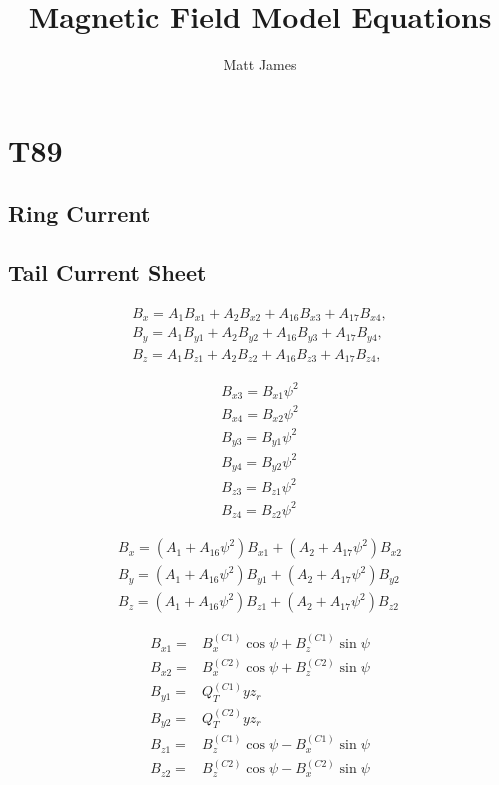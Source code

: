 \documentclass[]{article}
\title{Magnetic Field Model Equations}
\author{Matt James}
\begin{document}
\maketitle

	
\section{T89}

	\subsection{Ring Current}
	

	\subsection{Tail Current Sheet}
		\begin{align}
			B_x = A_1B_{x1} + A_2B_{x2} + A_{16}B_{x3} + A_{17}B_{x4},\\
			B_y = A_1B_{y1} + A_2B_{y2} + A_{16}B_{y3} + A_{17}B_{y4},\\
			B_z = A_1B_{z1} + A_2B_{z2} + A_{16}B_{z3} + A_{17}B_{z4},
		\end{align}
	
		\begin{align}
			B_{x3} = B_{x1}\psi^2 \\
			B_{x4} = B_{x2}\psi^2 \\
			B_{y3} = B_{y1}\psi^2 \\
			B_{y4} = B_{y2}\psi^2 \\
			B_{z3} = B_{z1}\psi^2 \\
			B_{z4} = B_{z2}\psi^2 
		\end{align}
	
		\begin{align}
			B_x = (A_1 + A_{16} \psi^2)B_{x1} + (A_2 + A_{17} \psi^2)B_{x2} \\
			B_y = (A_1 + A_{16} \psi^2)B_{y1} + (A_2 + A_{17} \psi^2)B_{y2} \\
			B_z = (A_1 + A_{16} \psi^2)B_{z1} + (A_2 + A_{17} \psi^2)B_{z2} 
		\end{align}
	
		\begin{align}
			B_{x1} =& B_{x}^{(C1)}\cos{\psi} + B_{z}^{(C1)}\sin{\psi} \\
			B_{x2} =& B_{x}^{(C2)}\cos{\psi} + B_{z}^{(C2)}\sin{\psi} \\
			B_{y1} =& Q_T^{(C1)} y z_r \\
			B_{y2} =& Q_T^{(C2)} y z_r \\
			B_{z1} =& B_{z}^{(C1)}\cos{\psi} - B_{x}^{(C1)}\sin{\psi} \\
			B_{z2} =& B_{z}^{(C2)}\cos{\psi} - B_{x}^{(C2)}\sin{\psi} 
		\end{align}
	
\end{document}
